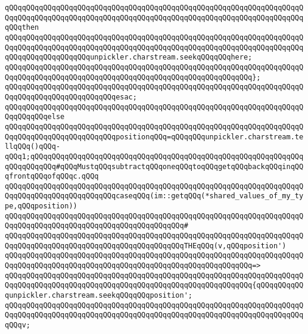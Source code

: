 \verb|qQQqqQQqqQQqqQQqqQQqqQQqqQQqqQQqqQQqqQQqqQQqqQQqqQQqqQQqqQQqqQQqqQQqqQQqqQQqqQQqqQQqqQQqqQQqqQQqqQQqqQQqqQQqqQQqqQQqqQQqqQQqqQQqqQQqqQQqqQQqqQQqthen|\newline
\verb|qQQqqQQqqQQqqQQqqQQqqQQqqQQqqQQqqQQqqQQqqQQqqQQqqQQqqQQqqQQqqQQqqQQqqQQqqQQqqQQqqQQqqQQqqQQqqQQqqQQqqQQqqQQqqQQqqQQqqQQqqQQqqQQqqQQqqQQqqQQqqQQqqQQqqQQqqQQqqQQqunpickler.charstream.seekqQQqqQQqhere;|\newline
\verb|qQQqqQQqqQQqqQQqqQQqqQQqqQQqqQQqqQQqqQQqqQQqqQQqqQQqqQQqqQQqqQQqqQQqqQQqqQQqqQQqqQQqqQQqqQQqqQQqqQQqqQQqqQQqqQQqqQQqqQQqqQQqqQQq};|\newline
\verb|qQQqqQQqqQQqqQQqqQQqqQQqqQQqqQQqqQQqqQQqqQQqqQQqqQQqqQQqqQQqqQQqqQQqqQQqqQQqqQQqqQQqqQQqqQQqqQQqesac;|\newline
\newline
\verb|qQQqqQQqqQQqqQQqqQQqqQQqqQQqqQQqqQQqqQQqqQQqqQQqqQQqqQQqqQQqqQQqqQQqqQQqqQQqqQQqelse|\newline
\verb|qQQqqQQqqQQqqQQqqQQqqQQqqQQqqQQqqQQqqQQqqQQqqQQqqQQqqQQqqQQqqQQqqQQqqQQqqQQqqQQqqQQqqQQqqQQqqQQqpositionqQQq=qQQqqQQqunpickler.charstream.tellqQQq()qQQq-qQQq1;qQQqqQQqqQQqqQQqqQQqqQQqqQQqqQQqqQQqqQQqqQQqqQQqqQQqqQQqqQQqqQQqqQQqqQQqqQQq#qQQqMustqQQqsubtractqQQqoneqQQqtoqQQqgetqQQqbackqQQqinqQQqfrontqQQqofqQQqc.qQQq|\newline
\newline
\verb|qQQqqQQqqQQqqQQqqQQqqQQqqQQqqQQqqQQqqQQqqQQqqQQqqQQqqQQqqQQqqQQqqQQqqQQqqQQqqQQqqQQqqQQqqQQqqQQqcaseqQQq(im::getqQQq(*shared_values_of_my_type,qQQqposition))|\newline
\verb|qQQqqQQqqQQqqQQqqQQqqQQqqQQqqQQqqQQqqQQqqQQqqQQqqQQqqQQqqQQqqQQqqQQqqQQqqQQqqQQqqQQqqQQqqQQqqQQqqQQqqQQqqQQqqQQq#|\newline
\verb|qQQqqQQqqQQqqQQqqQQqqQQqqQQqqQQqqQQqqQQqqQQqqQQqqQQqqQQqqQQqqQQqqQQqqQQqqQQqqQQqqQQqqQQqqQQqqQQqqQQqqQQqqQQqqQQqTHEqQQq(v,qQQqposition')|\newline
\verb|qQQqqQQqqQQqqQQqqQQqqQQqqQQqqQQqqQQqqQQqqQQqqQQqqQQqqQQqqQQqqQQqqQQqqQQqqQQqqQQqqQQqqQQqqQQqqQQqqQQqqQQqqQQqqQQqqQQqqQQqqQQqqQQq=>|\newline
\verb|qQQqqQQqqQQqqQQqqQQqqQQqqQQqqQQqqQQqqQQqqQQqqQQqqQQqqQQqqQQqqQQqqQQqqQQqqQQqqQQqqQQqqQQqqQQqqQQqqQQqqQQqqQQqqQQqqQQqqQQqqQQqqQQq{qQQqqQQqqQQqunpickler.charstream.seekqQQqqQQqposition';|\newline
\verb|qQQqqQQqqQQqqQQqqQQqqQQqqQQqqQQqqQQqqQQqqQQqqQQqqQQqqQQqqQQqqQQqqQQqqQQqqQQqqQQqqQQqqQQqqQQqqQQqqQQqqQQqqQQqqQQqqQQqqQQqqQQqqQQqqQQqqQQqqQQqqQQqv;|\newline
